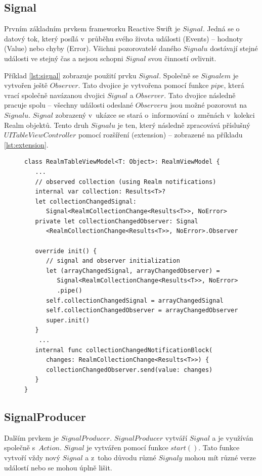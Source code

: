 \documentclass[thesis=M,czech]{FITthesis}[2012/06/26]
\begin{document}
\subsection{Signal}
Prvním základním prvkem frameworku Reactive Swift je $Signal$. Jedná se o datový tok, který posílá v~průběhu svého života události (Events) -- hodnoty (Value) nebo chyby (Error). Všichni pozorovatelé daného $Signalu$ dostávají stejné události ve stejný čas a nejsou schopni $Signal$ svou činností ovlivnit. \cite{signal}

Příklad \ref{lst:signal} zobrazuje použití prvku $Signal$. Společně se $Signalem$ je vytvořen ještě $Observer$. Tato dvojice je vytvořena pomocí funkce $pipe$, která vrací společně navázanou dvojici $Signal$ a $Observer$. Tato dvojice následně pracuje spolu -- všechny události odeslané $Observeru$ jsou možné pozorovat na $Signalu$. $Signal$ zobrazený v~ukázce se stará o~informování o~změnách v~kolekci Realm objektů. Tento druh $Signalu$ je ten, který následně zpracovává příslušný $UITableViewController$ pomocí rozšíření (extension) -- zobrazené na příkladu \ref{lst:extension}.

\begin{figure}
\begin{minipage}{\linewidth}
\begin{lstlisting}[caption={Ukázka použití prvku Signal},label={lst:signal}]
class RealmTableViewModel<T: Object>: RealmViewModel {
   ...
   // observed collection (using Realm notifications)
   internal var collection: Results<T>?
   let collectionChangedSignal: 
      Signal<RealmCollectionChange<Results<T>>, NoError>
   private let collectionChangedObserver: Signal
      <RealmCollectionChange<Results<T>>, NoError>.Observer

   override init() {
      // signal and observer initialization
      let (arrayChangedSignal, arrayChangedObserver) = 
         Signal<RealmCollectionChange<Results<T>>, NoError>
         .pipe()
      self.collectionChangedSignal = arrayChangedSignal
      self.collectionChangedObserver = arrayChangedObserver
      super.init()
   }
    ...
   internal func collectionChangedNotificationBlock(
      changes: RealmCollectionChange<Results<T>>) {
      collectionChangedObserver.send(value: changes)
   }
}
\end{lstlisting}
\end{minipage}
\end{figure}	

\subsection{SignalProducer}
Dalším prvkem je $SignalProducer$. $SignalProducer$ vytváří $Signal$ a je využíván společně s~$Action$. $Signal$ je vytvářen pomocí funkce $start()$. Tato funkce vytvoří vždy nový $Signal$ a z~toho důvodu různé $Signaly$ mohou mít různé verze událostí nebo se mohou úplně lišit. \cite{signalProducer}
\end{document}
